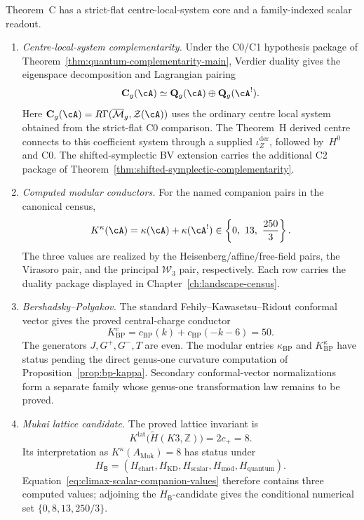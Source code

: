 \begin{theorem}
\label{thm:theorem-c-platonic-pointer}
\ClaimStatusConditional
Theorem~C has a strict-flat centre-local-system core and a
family-indexed scalar readout.
\begin{enumerate}[label=\textup{(\alph*)}]
\item \emph{Centre-local-system complementarity.}
Under the C0/C1 hypothesis package of
Theorem~\ref{thm:quantum-complementarity-main}, Verdier duality gives
the eigenspace decomposition and Lagrangian pairing
\[
 \mathbf C_g(\cA)
 \simeq
 \mathbf Q_g(\cA)\oplus\mathbf Q_g(\cA^!).
\]
Here
$\mathbf C_g(\cA)=R\Gamma(\overline{\mathcal M}_g,\mathcal Z(\cA))$
uses the ordinary centre local system obtained from the strict-flat C0
comparison.  The Theorem~H derived centre connects to this coefficient
system through a supplied $\iota_Z^{\mathrm{der}}$, followed by~$H^0$
and C0.
The shifted-symplectic BV extension carries the additional C2 package
of Theorem~\ref{thm:shifted-symplectic-complementarity}.

\item \emph{Computed modular conductors.}
For the named companion pairs in the canonical census,
\[
 K^\kappa(\cA)=\kappa(\cA)+\kappa(\cA^!)
 \in
 \left\{0,\ 13,\ \frac{250}{3}\right\}.
\]
The three values are realized by the Heisenberg/affine/free-field
pairs, the Virasoro pair, and the principal \(\mathcal W_3\) pair,
respectively.  Each row carries the duality package displayed in
Chapter~\ref{ch:landscape-census}.

\item \emph{Bershadsky--Polyakov.}
The standard Fehily--Kawasetsu--Ridout conformal vector gives the
proved central-charge conductor
\[
 K^c_{\mathrm{BP}}
 =c_{\mathrm{BP}}(k)+c_{\mathrm{BP}}(-k-6)=50.
\]
The generators \(J,G^+,G^-,T\) are even.  The modular entries
\(\kappa_{\mathrm{BP}}\) and \(K^\kappa_{\mathrm{BP}}\) have status
\ClaimStatusOpen{} pending the direct genus-one curvature computation
of Proposition~\ref{prop:bp-kappa}.  Secondary conformal-vector
normalizations form a separate family whose genus-one transformation
law remains to be proved.

\item \emph{Mukai lattice candidate.}
The proved lattice invariant is
\[
 K^{\mathrm{lat}}\bigl(\widetilde H(K3,\mathbb Z)\bigr)
 =2c_+=8.
\]
Its interpretation as
\(K^\kappa(A_{\mathrm{Muk}})=8\) has status
\ClaimStatusConjectured{} under
\[
 H_{\mathsf B}
 =(H_{\mathrm{chart}},H_{\mathrm{KD}},H_{\mathrm{scalar}},
   H_{\mathrm{mod}},H_{\mathrm{quantum}}).
\]
Equation~\eqref{eq:climax-scalar-companion-values} therefore contains
three computed values; adjoining the \(H_{\mathsf B}\)-candidate gives
the conditional numerical set \(\{0,8,13,250/3\}\).
\end{enumerate}
\end{theorem}

